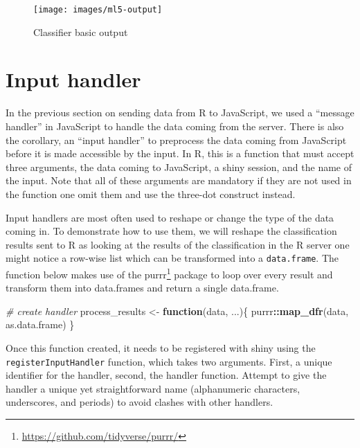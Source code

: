 \documentclass[10pt,]{krantz}
\makeatletter
\newenvironment{Shaded}{\begin{snugshade}}{\end{snugshade}}
\newcommand{\CommentTok}[1]{\textcolor[rgb]{0.37,0.37,0.37}{\textit{#1}}}
\newcommand{\ControlFlowTok}[1]{\textcolor[rgb]{0.27,0.27,0.27}{\textbf{#1}}}
\newcommand{\KeywordTok}[1]{\textcolor[rgb]{0.27,0.27,0.27}{\textbf{#1}}}
\newcommand{\NormalTok}[1]{#1}
\newcommand{\OperatorTok}[1]{\textcolor[rgb]{0.43,0.43,0.43}{\textbf{#1}}}
\newcommand{\StringTok}[1]{\textcolor[rgb]{0.5,0.5,0.5}{#1}}
\renewcommand{\href}[2]{#2\footnote{\url{#1}}}
\newenvironment{kframe}{%
\medskip{}
\setlength{\fboxsep}{.8em}
 \def\at@end@of@kframe{}%
 \ifinner\ifhmode%
  \def\at@end@of@kframe{\end{minipage}}%
  \begin{minipage}{\columnwidth}%
 \fi\fi%
 \def\FrameCommand##1{\hskip\@totalleftmargin \hskip-\fboxsep
 \colorbox{shadecolor}{##1}\hskip-\fboxsep
     \hskip-\linewidth \hskip-\@totalleftmargin \hskip\columnwidth}%
 \MakeFramed {\advance\hsize-\width
   \@totalleftmargin\z@ \linewidth\hsize
   \@setminipage}}%
 {\par\unskip\endMakeFramed%
 \at@end@of@kframe}
\renewenvironment{Shaded}{\begin{kframe}}{\end{kframe}}
\makeatother
\begin{document}
\begin{figure}[H]

{\centering \texttt{[image: images/ml5-output]} 

}

\caption{Classifier basic output}\label{fig:shiny-complete-ml5-output}
\end{figure}

\hypertarget{shiny-complete-input-handler}{%
\section{Input handler}\label{shiny-complete-input-handler}}

In the previous section on sending data from R to JavaScript, we used a ``message handler'' in JavaScript to handle the data coming from the server. There is also the corollary, an ``input handler'' to preprocess the data coming from JavaScript before it is made accessible by the input. In R, this is a function that must accept three arguments, the data coming to JavaScript, a shiny session, and the name of the input. Note that all of these arguments are mandatory if they are not used in the function one omit them and use the three-dot construct instead.

Input handlers are most often used to reshape or change the type of the data coming in. To demonstrate how to use them, we will reshape the classification results sent to R as looking at the results of the classification in the R server one might notice a row-wise list which can be transformed into a \texttt{data.frame}. The function below makes use of the \href{https://github.com/tidyverse/purrr/}{purrr} \citep{R-purrr} package to loop over every result and transform them into data.frames and return a single data.frame.

\begin{Shaded}
\begin{Highlighting}[]
\CommentTok{# create handler}
\NormalTok{process_results <-}\StringTok{ }\ControlFlowTok{function}\NormalTok{(data, ...)\{}
\NormalTok{  purrr}\OperatorTok{::}\KeywordTok{map_dfr}\NormalTok{(data, as.data.frame)}
\NormalTok{\}}
\end{Highlighting}
\end{Shaded}

Once this function created, it needs to be registered with shiny using the \texttt{registerInputHandler} function, which takes two arguments. First, a unique identifier for the handler, second, the handler function. Attempt to give the handler a unique yet straightforward name (alphanumeric characters, underscores, and periods) to avoid clashes with other handlers.
\end{document}
